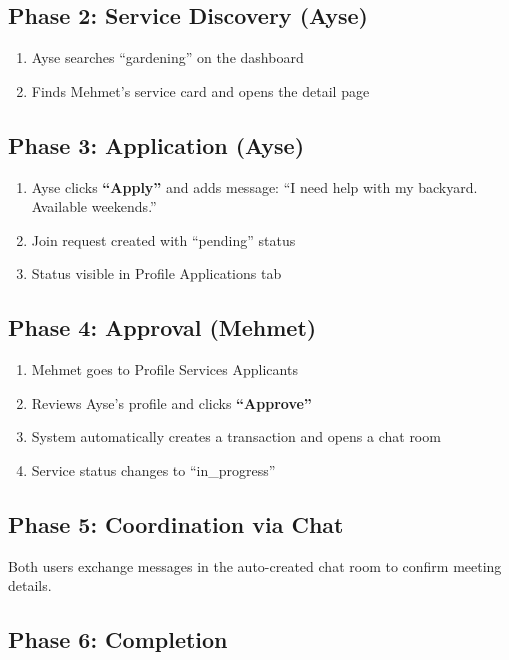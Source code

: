 \documentclass[10pt,a4paper]{report}
\begin{document}
\subsection{Phase 2: Service Discovery (Ayse)}

\begin{enumerate}
    \item Ayse searches ``gardening'' on the dashboard
    \item Finds Mehmet's service card and opens the detail page
\end{enumerate}

\subsection{Phase 3: Application (Ayse)}

\begin{enumerate}
    \item Ayse clicks \textbf{``Apply''} and adds message: ``I need help with my backyard. Available weekends.''
    \item Join request created with ``pending'' status
    \item Status visible in Profile \textrightarrow{} Applications tab
\end{enumerate}

\subsection{Phase 4: Approval (Mehmet)}

\begin{enumerate}
    \item Mehmet goes to Profile \textrightarrow{} Services \textrightarrow{} Applicants
    \item Reviews Ayse's profile and clicks \textbf{``Approve''}
    \item System automatically creates a transaction and opens a chat room
    \item Service status changes to ``in\_progress''
\end{enumerate}

\subsection{Phase 5: Coordination via Chat}

Both users exchange messages in the auto-created chat room to confirm meeting details.

\subsection{Phase 6: Completion}
\end{document}
